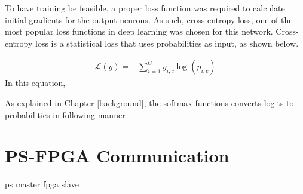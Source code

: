 To have training be feasible, a proper loss function was required to calculate initial gradients for the output neurons. As such, cross entropy loss, one of the most popular loss functions in deep learning was chosen for this network. Cross-entropy loss is a statistical loss that uses probabilities as input, as shown below.



\begin{align}
\mathcal{L}(y) = - \sum_{i = 1}^{C}y_{i,c}\log(p_{i,c})
\end{align}
In this equation, 

As explained in Chapter \ref{background}, the softmax functions converts logits to probabilities in following manner

\section{PS-FPGA Communication}\label{az-com}
ps master fpga slave

